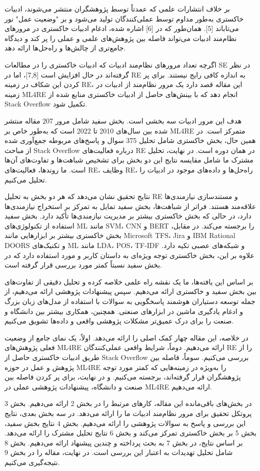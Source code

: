 \documentclass[a4paper,10pt]{article}
\begin{document}
    بر خلاف انتشارات علمی که عمدتاً توسط پژوهشگران منتشر می‌شوند، ادبیات خاکستری به‌طور مداوم توسط عملی‌کنندگان تولید می‌شود و بر "وضعیت عمل" نور می‌تاباند [5]. همان‌طور که در [6] اشاره شده، ادغام ادبیات خاکستری در مرورهای نظام‌مند ادبیات می‌تواند فاصله بین پژوهش‌های علمی و عملی را پر کند و دیدگاه جامع‌تری از چالش‌ها و راه‌حل‌ها ارائه دهد.

    اگرچه تعداد مرورهای نظام‌مند ادبیات که ادبیات خاکستری را در مطالعات SE در نظر گرفته‌اند در حال افزایش است [7,8]، اما در RE به اندازه کافی رایج نیستند. برای پر کردن این شکاف در زمینه RE، این مقاله قصد دارد یک مرور نظام‌مند از ادبیات در زمینه ML4RE انجام دهد که با بینش‌های حاصل از ادبیات خاکستری منابع شده از Stack Overflow تکمیل شود.

    هدف این مرور ادبیات سه بخشی است. بخش سفید شامل مرور 207 مقاله منتشر شده بین سال‌های 2010 تا 2022 است که به‌طور خاص بر ML4RE متمرکز است. در همین حال، بخش خاکستری شامل تحلیل 375 سوال و پاسخ‌های مربوطه جمع‌آوری شده از مباحث Stack Overflow درباره فعالیت‌های RE در همان دوره است. در نهایت، تحلیل مشترک ما شامل مقایسه نتایج این دو بخش برای تشخیص شباهت‌ها و تفاوت‌های آن‌ها است. ما روندها، فعالیت‌های RE، وظایف RE، راه‌حل‌ها و داده‌های موجود در ادبیات را تحلیل می‌کنیم.

    نتایج تحقیق نشان می‌دهد که هر دو بخش به تحلیل RE و مستندسازی نیازمندی‌ها علاقه‌مند هستند. فراتر از شباهت‌ها، بخش سفید تمایل به تمرکز بر استخراج نیازمندی‌ها دارد، در حالی که بخش خاکستری بیشتر بر مدیریت نیازمندی‌ها تأکید دارد. بخش سفید استفاده از تکنولوژی‌های ML مانند SVM، CNN و BERT را برجسته می‌کند. در مقابل، بخش خاکستری بیشتر بر ابزارهایی مانند Microsoft TFS، Jira و IBM Rational DOORS و تکنیک‌های ML مانند LDA، POS، TF-IDF و شبکه‌های عصبی تکیه دارد. علاوه بر این، بخش خاکستری توجه ویژه‌ای به داستان کاربر و مورد استفاده دارد که در بخش سفید نسبتاً کمتر مورد بررسی قرار گرفته است.

    بر اساس این یافته‌ها، ما یک نقشه راه علمی خلاصه کرده و تحلیل دقیقی از تفاوت‌های بین بخش سفید و خاکستری ارائه می‌دهیم. سپس پیشنهادات پژوهشی ارائه می‌دهیم، از جمله توسعه دستیاران هوشمند پاسخگویی به سوالات با استفاده از مدل‌های زبان بزرگ و ادغام یادگیری ماشین در ابزارهای صنعتی. همچنین، همکاری بیشتر بین دانشگاه و صنعت را برای درک عمیق‌تر مشکلات پژوهشی واقعی و داده‌ها تشویق می‌کنیم.

    در خلاصه، این مقاله چهار کمک اصلی را ارائه می‌دهد. اولاً، یک نمای جامع از وضعیت فعلی پژوهش‌های ML4RE ارائه می‌دهیم. دوماً، شرایط واقعی عملی‌کنندگان RE را از طریق ادبیات خاکستری حاصل از Stack Overflow بررسی می‌کنیم. سوماً، فاصله بین پژوهش و عمل در حوزه ML4RE را به‌ویژه در زمینه‌هایی که کمتر مورد توجه پژوهشگران قرار گرفته‌اند، برجسته می‌کنیم. و در نهایت، برای پر کردن فاصله بین صنعت و دانشگاه، پیشنهادات پژوهشی عملی در ML4RE ارائه می‌دهیم.

    در بخش‌های باقی‌مانده این مقاله، کارهای مرتبط را در بخش 2 ارائه می‌دهیم. بخش 3 پروتکل تحقیق برای مرور نظام‌مند ادبیات ما را ارائه می‌دهد. در سه بخش بعدی، نتایج این بررسی و پاسخ به سوالات پژوهشی را ارائه می‌دهیم. بخش 4 نتایج بخش سفید، بخش 5 بر بخش خاکستری تمرکز می‌کند و بخش 6 نتایج تحلیل مشترک را ارائه می‌دهد. بر اساس نتایج، در بخش 7 به بحث پرداخته و چندین پیشنهاد ارائه می‌دهیم. بخش 8 شامل تحلیل تهدیدات به اعتبار این بررسی است. در نهایت، مقاله را در بخش 9 نتیجه‌گیری می‌کنیم.
\end{document}
